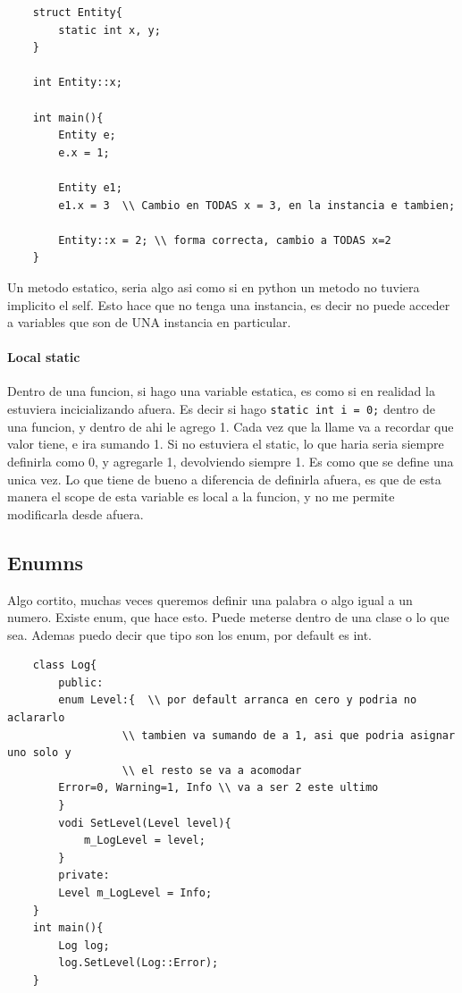 \documentclass[11pt]{article}
\begin{document}
\begin{lstlisting}
    struct Entity{
        static int x, y;
    }

    int Entity::x;

    int main(){
        Entity e;
        e.x = 1;

        Entity e1;
        e1.x = 3  \\ Cambio en TODAS x = 3, en la instancia e tambien;

        Entity::x = 2; \\ forma correcta, cambio a TODAS x=2
    }
\end{lstlisting}

Un metodo estatico, seria algo asi como si en python un metodo no
tuviera implicito el self.
Esto hace que no tenga una instancia, es decir no puede acceder a variables que son
de UNA instancia en particular.

\paragraph{Local static}
Dentro de una funcion, si hago una variable estatica, es como si en realidad la
estuviera incicializando afuera.
Es decir si hago \texttt{static int i = 0;} dentro de una funcion, y dentro de ahi
le agrego 1.
Cada vez que la llame va a recordar que valor tiene, e ira sumando 1.
Si no estuviera el static, lo que haria seria siempre definirla como 0, y agregarle
1, devolviendo siempre 1.
Es como que se define una unica vez.
Lo que tiene de bueno a diferencia de definirla afuera, es que de esta manera
el scope de esta variable es local a la funcion, y no me permite modificarla
desde afuera.

\subsection{Enumns}
Algo cortito, muchas veces queremos definir una palabra o algo igual a un numero.
Existe enum, que hace esto.
Puede meterse dentro de una clase o lo que sea.
Ademas puedo decir que tipo son los enum, por default es int.
\begin{lstlisting}
    class Log{
        public:
        enum Level:{  \\ por default arranca en cero y podria no aclararlo
                  \\ tambien va sumando de a 1, asi que podria asignar uno solo y
                  \\ el resto se va a acomodar
        Error=0, Warning=1, Info \\ va a ser 2 este ultimo
        }
        vodi SetLevel(Level level){
            m_LogLevel = level;
        }
        private:
        Level m_LogLevel = Info;
    }
    int main(){
        Log log;
        log.SetLevel(Log::Error);
    }
\end{lstlisting}
\end{document}
